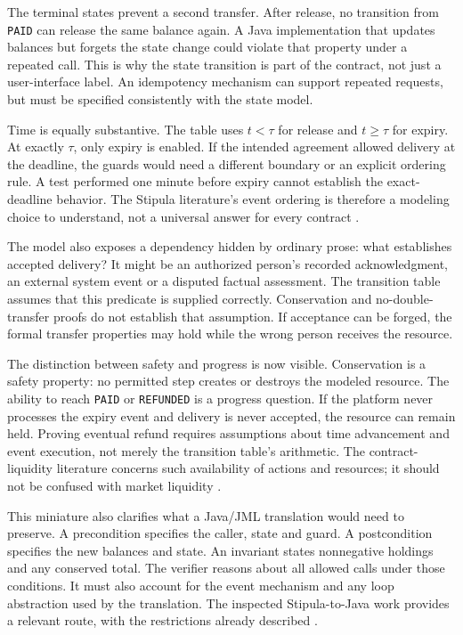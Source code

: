 \documentclass[12pt,a4paper,oneside,openany]{book}
\begin{document}
The terminal states prevent a second transfer. After release, no transition from
\texttt{PAID} can release the same balance again. A Java implementation that
updates balances but forgets the state change could violate that property under
a repeated call. This is why the state transition is part of the contract, not
just a user-interface label. An idempotency mechanism can support repeated
requests, but must be specified consistently with the state model.

Time is equally substantive. The table uses $t<\tau$ for release and
$t\geq\tau$ for expiry. At exactly $\tau$, only expiry is enabled. If the intended
agreement allowed delivery at the deadline, the guards would need a different
boundary or an explicit ordering rule. A test performed one minute before expiry
cannot establish the exact-deadline behavior. The Stipula literature's event
ordering is therefore a modeling choice to understand, not a universal answer
for every contract \citep{stipula2021}.

The model also exposes a dependency hidden by ordinary prose: what establishes
accepted delivery? It might be an authorized person's recorded acknowledgment,
an external system event or a disputed factual assessment. The transition table
assumes that this predicate is supplied correctly. Conservation and no-double-
transfer proofs do not establish that assumption. If acceptance can be forged,
the formal transfer properties may hold while the wrong person receives the
resource.

The distinction between safety and progress is now visible. Conservation is a
safety property: no permitted step creates or destroys the modeled resource.
The ability to reach \texttt{PAID} or \texttt{REFUNDED} is a progress question.
If the platform never processes the expiry event and delivery is never accepted,
the resource can remain held. Proving eventual refund requires assumptions about
time advancement and event execution, not merely the transition table's arithmetic.
The contract-liquidity literature concerns such availability of actions and
resources; it should not be confused with market liquidity \citep{liquidity2023}.

This miniature also clarifies what a Java/JML translation would need to preserve.
A precondition specifies the caller, state and guard. A postcondition specifies
the new balances and state. An invariant states nonnegative holdings and any
conserved total. The verifier reasons about all allowed calls under those
conditions. It must also account for the event mechanism and any loop abstraction
used by the translation. The inspected Stipula-to-Java work provides a relevant
route, with the restrictions already described \citep{stipulakey2025}.
\end{document}
